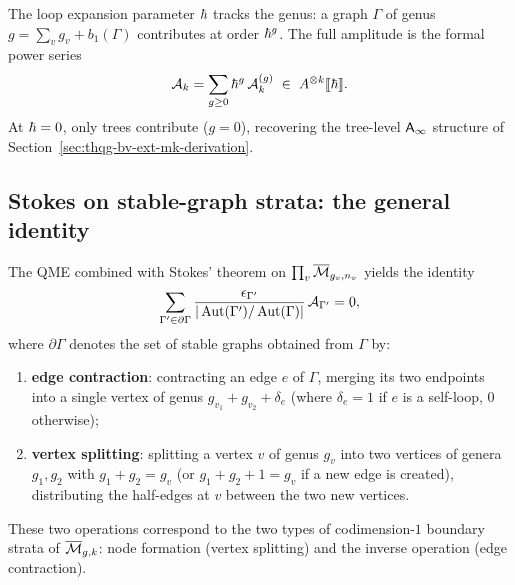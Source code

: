 \begin{remark}
The loop expansion parameter $\hbar$ tracks the genus: a graph
$\Gamma$ of genus $g = \sum_v g_v + b_1(\Gamma)$ contributes at
order $\hbar^g$. The full amplitude is the formal power series
\[
\mathcal{A}_k = \sum_{g \ge 0} \hbar^g\,\mathcal{A}_k^{(g)}
\;\in\; A^{\otimes k}\llbracket\hbar\rrbracket.
\]
At $\hbar = 0$, only trees contribute ($g = 0$), recovering the
tree-level $\mathsf{A}_{\infty}$ structure of
Section~\ref{sec:thqg-bv-ext-mk-derivation}.
\end{remark}

\subsection{Stokes on stable-graph strata: the general identity}

\begin{theorem}
\label{thm:thqg-bv-ext-stable-stokes}
The QME combined with Stokes' theorem on
$\prod_v \overline{\mathcal{M}}_{g_v, n_v}$ yields the identity
\begin{equation}
\sum_{\Gamma' \in \partial\Gamma}
\frac{\epsilon_{\Gamma'}}{|\operatorname{Aut}(\Gamma')/\operatorname{Aut}(\Gamma)|}
\,\mathcal{A}_{\Gamma'}
= 0,
\end{equation}
where $\partial\Gamma$ denotes the set of stable graphs obtained
from $\Gamma$ by:
\begin{enumerate}[label=(\alph*)]
\item \textbf{edge contraction}: contracting an edge $e$ of
 $\Gamma$, merging its two endpoints into a single vertex of
 genus $g_{v_1} + g_{v_2} + \delta_{e}$ (where
 $\delta_e = 1$ if $e$ is a self-loop, $0$ otherwise);
\item \textbf{vertex splitting}: splitting a vertex $v$ of genus
 $g_v$ into two vertices of genera $g_1, g_2$ with
 $g_1 + g_2 = g_v$ (or $g_1 + g_2 + 1 = g_v$ if a new edge is
 created), distributing the half-edges at $v$ between the two
 new vertices.
\end{enumerate}
These two operations correspond to the two types of codimension-$1$
boundary strata of $\overline{\mathcal{M}}_{g,k}$: node formation
(vertex splitting) and the inverse operation (edge contraction).
\end{theorem}


